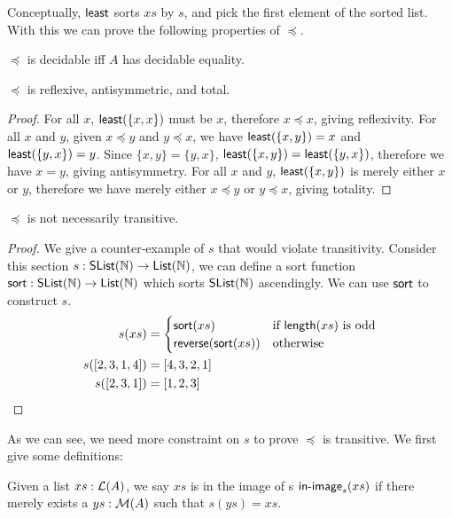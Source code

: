 Conceptually, $\operatorname{\mathsf{least}}$ sorts $xs$ by $s$, and pick the first element of the sorted list.
With this we can prove the following properties of $\preccurlyeq$.

\begin{proposition}
    $\preccurlyeq$ is decidable iff $A$ has decidable equality.
\end{proposition}

\begin{proposition}
$\preccurlyeq$ is reflexive, antisymmetric, and total.
\end{proposition}
\begin{proof}
For all $x$, $\operatorname{\mathsf{least}}(\{x, x\})$ must be $x$, therefore $x \preccurlyeq x$, giving reflexivity.
For all $x$ and $y$, given $x \preccurlyeq y$ and $y \preccurlyeq x$,
we have $\operatorname{\mathsf{least}}(\{x, y\}) = x$ and $\operatorname{\mathsf{least}}(\{y, x\}) = y$.
Since $\{x, y\} = \{y, x\}$, $\operatorname{\mathsf{least}}(\{x, y\}) = \operatorname{\mathsf{least}}(\{y, x\})$,
therefore we have $x = y$, giving antisymmetry.
For all $x$ and $y$, $\operatorname{\mathsf{least}}(\{x, y\})$ is merely either $x$ or $y$,
therefore we have merely either $x \preccurlyeq y$ or $y \preccurlyeq x$, giving totality.
\end{proof}

\begin{proposition}
$\preccurlyeq$ is not necessarily transitive.
\end{proposition}
\begin{proof}
We give a counter-example of $s$ that would violate transitivity.
Consider this section $s : \operatorname{\mathsf{SList}}(\mathbb{N}) \to \operatorname{\mathsf{List}}(\mathbb{N})$, we can define a sort function
$\operatorname{\mathsf{sort}} : \operatorname{\mathsf{SList}}(\mathbb{N}) \to \operatorname{\mathsf{List}}(\mathbb{N})$ which sorts $\operatorname{\mathsf{SList}}(\mathbb{N})$ ascendingly. We can use $\operatorname{\mathsf{sort}}$
to construct $s$.
\begin{align*}
    s(xs) &= \begin{cases}
        \operatorname{\mathsf{sort}}(xs) & \text{if $\operatorname{\mathsf{length}}(xs)$ is odd} \\        
        \operatorname{\mathsf{reverse}}(\operatorname{\mathsf{sort}}(xs)) & \text{otherwise}
    \end{cases}\\
    s([2,3,1,4]) &= [4,3,2,1]\\
    s([2,3,1]) &= [1,2,3]
\end{align*}
\end{proof}

As we can see, we need more constraint on $s$ to prove $\preccurlyeq$ is transitive.
We first give some definitions:
\begin{definition}
    Given a list $xs : \mathcal{L}(A)$, we say $xs$ is in the image of s $\operatorname{\mathsf{in-image}}_s(xs)$ if there merely exists
    a $ys : \mathcal{M}(A)$ such that $s(ys) = xs$.
\end{definition}

